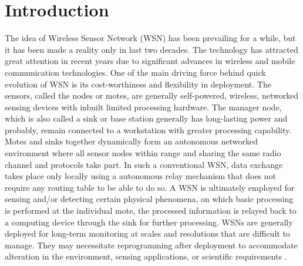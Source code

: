 \documentclass[conference,man]{IEEEtran}
\begin{document}



\section{Introduction}
\label{sec:intro}


The idea of Wireless Sensor Network (WSN) has been prevailing for a while, but it has been made a reality only in last two decades. 
The technology has attracted great attention in recent years due to significant advances in wireless and mobile communication technologies. 
One of the main driving force behind quick evolution of WSN is its cost-worthiness and flexibility in deployment.  
The sensors, called the nodes or motes, are generally self-powered, wireless, networked sensing devices with inbuilt limited processing hardware.    
The manager node, which is also called a sink or base station generally has long-lasting power and probably, remain connected to a workstation with greater processing capability. 
Motes and sinks together dynamically form an autonomous networked environment where all sensor nodes within range and sharing the same radio channel and protocols take part.
In such a conventional WSN, data exchange takes place only locally using a autonomous relay mechanism that does not require any routing table to be able to do so. 
A WSN is ultimately employed for sensing and/or detecting certain physical phenomena, on which basic processing is performed at the individual mote, the processed information is relayed back to a computing device  through the sink for further processing.
WSNs are generally deployed for long-term monitoring at scales and resolutions that are difficult to manage. 
They may necessitate reprogramming after deployment to accommodate alteration in the environment, sensing applications, or scientific requirements \cite{ISI:000253439700120}.
\end{document}
